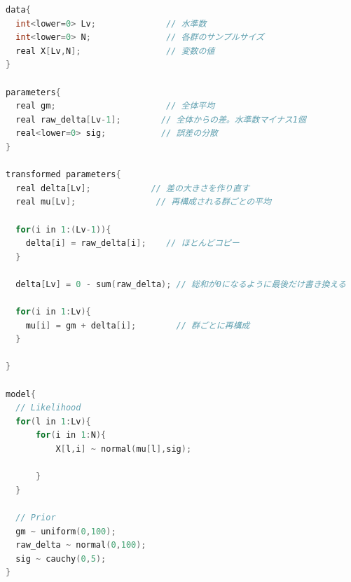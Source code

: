 \documentclass{ltjsbook}
\begin{document}
\begin{lstlisting}[language=C++,label={stan::21_05},caption={群の数を一般化したコード}]
data{
  int<lower=0> Lv;              // 水準数
  int<lower=0> N;               // 各群のサンプルサイズ       
  real X[Lv,N];                 // 変数の値
}

parameters{
  real gm;                      // 全体平均
  real raw_delta[Lv-1];        // 全体からの差。水準数マイナス1個
  real<lower=0> sig;           // 誤差の分散
}

transformed parameters{
  real delta[Lv];            // 差の大きさを作り直す
  real mu[Lv];                // 再構成される群ごとの平均
  
  for(i in 1:(Lv-1)){
    delta[i] = raw_delta[i];    // ほとんどコピー
  }
  
  delta[Lv] = 0 - sum(raw_delta); // 総和が0になるように最後だけ書き換える

  for(i in 1:Lv){
    mu[i] = gm + delta[i];        // 群ごとに再構成
  }
  
}

model{
  // Likelihood
  for(l in 1:Lv){
      for(i in 1:N){
          X[l,i] ~ normal(mu[l],sig);
          
      }
  }
    
  // Prior
  gm ~ uniform(0,100);
  raw_delta ~ normal(0,100);
  sig ~ cauchy(0,5);
}

\end{lstlisting}
\end{document}
